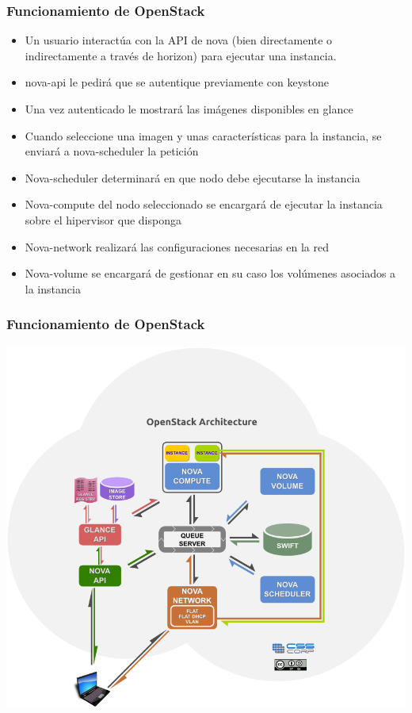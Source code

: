 \documentclass{beamer}
\begin{document}
\begin{frame}
  \frametitle{Funcionamiento de OpenStack}
  \begin{itemize}
  \item Un usuario interactúa con la API de nova (bien directamente o
    indirectamente a través de horizon) para ejecutar una instancia.
  \item nova-api le pedirá que se autentique previamente con keystone
  \item Una vez autenticado le mostrará las imágenes disponibles en glance
  \item Cuando seleccione una imagen y unas características para la instancia,
    se enviará a nova-scheduler la petición
  \item Nova-scheduler determinará en que nodo debe ejecutarse la instancia
  \item Nova-compute del nodo seleccionado se encargará de ejecutar la instancia
    sobre el hipervisor que disponga
  \item Nova-network realizará las configuraciones necesarias en la red
  \item Nova-volume se encargará de gestionar en su caso los volúmenes asociados
    a la instancia
  \end{itemize}
\end{frame}

\begin{frame}
  \frametitle{Funcionamiento de OpenStack}
  \begin{center}
    \includegraphics[height=.75\textheight]{../img/Archhtml.png}
  \end{center}
\end{frame}
\end{document}
